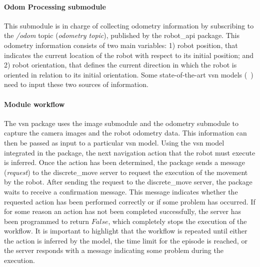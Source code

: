 \paragraph*{Odom Processing submodule}\label{par:odom-processing}

This submodule is in charge of collecting odometry information by subscribing to the \textit{/odom} topic (\textit{odometry topic}), published by the robot\_api package.
This odometry information consists of two main variables: 1) robot position, that indicates the current location of the robot with respect to its initial position; and 2) robot orientation, that defines the current direction in which the robot is oriented in relation to its initial orientation.
Some state-of-the-art \acrshort{vsn} models (\eg~\cite{ramrakhya2023}) need to input these two sources of information.

\paragraph*{\textbf{Module workflow}}\label{par:module-workflow}

The \acrshort{vsn} package uses the image submodule and the odometry submodule to capture the camera images and the robot odometry data.
This information can then be passed as input to a particular \acrshort{vsn} model.
Using the \acrshort{vsn} model integrated in the package, the next navigation action that the robot must execute is inferred.
Once the action has been determined, the package sends a message (\textit{request}) to the discrete\_move server to request the execution of the movement by the robot.
After sending the request to the discrete\_move server, the package waits to receive a confirmation message.
This message indicates whether the requested action has been performed correctly or if some problem has occurred.
If for some reason an action has not been completed successfully, the server has been programmed to return $False$, which completely stops the execution of the workflow.
It is important to highlight that the workflow is repeated until either the \stopac action is inferred by the model, the time limit for the episode is reached, or the server responds with a message indicating some problem during the execution.

